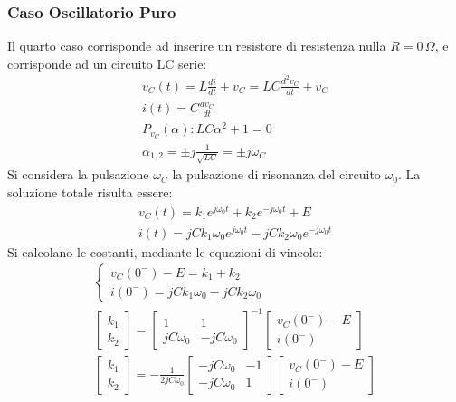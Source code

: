 \documentclass{article}
\numberwithin{equation}{subsection}
\begin{document}
\subsubsection{Caso Oscillatorio Puro}

Il quarto caso corrisponde ad inserire un resistore di resistenza nulla $R=0\,\Omega$, e corrisponde ad un circuito LC serie:
\begin{gather*}
    v_C(t)=L\displaystyle\frac{di}{dt}+v_C=LC\frac{d^2v_C}{dt}+v_C\\
    i(t)=C\displaystyle\frac{dv_C}{dt}\\
    P_{v_C}(\alpha):LC\alpha^2+1=0\\
    \alpha_{1,2}=\displaystyle\pm j\frac{1}{\sqrt{LC}}=\pm j\omega_C
\end{gather*}
Si considera la pulsazione $\omega_C$ la pulsazione di risonanza del circuito $\omega_0$. 
La soluzione totale risulta essere:
\begin{gather*}
    v_C(t)=k_1e^{j\omega_0t}+k_2e^{-j\omega_0t}+E\\
    i(t)=jCk_1\omega_0e^{j\omega_0t}-jCk_2\omega_0e^{-j\omega_0t}
\end{gather*}
Si calcolano le costanti, mediante le equazioni di vincolo:
\begin{gather*}
    \begin{cases}
        v_C(0^-)-E=k_1+k_2\\
        i(0^-)=jCk_1\omega_0-jCk_2\omega_0
    \end{cases}\\
    \begin{bmatrix}
        k_1\\k_2
    \end{bmatrix}=
    \begin{bmatrix}
        1&1\\jC\omega_0&-jC\omega_0 
    \end{bmatrix}^{-1}
    \begin{bmatrix}
        v_C(0^-)-E\\i(0^-)
    \end{bmatrix}\\
    \begin{bmatrix}
        k_1\\k_2
    \end{bmatrix}=\displaystyle-\frac{1}{2jC\omega_0}
    \begin{bmatrix}
        -jC\omega_0&-1\\-jC\omega_0&1
    \end{bmatrix}
    \begin{bmatrix}
        v_C(0^-)-E\\i(0^-)
    \end{bmatrix}
\end{gather*}
\end{document}
